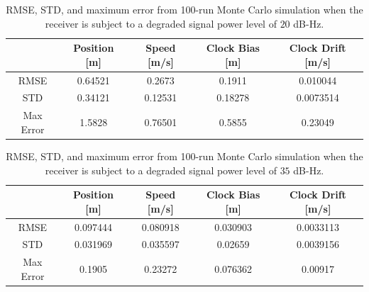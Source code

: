 \begin{table}[!ht]
    \caption{RMSE, STD, and maximum error from 100-run Monte Carlo simulation when the receiver is subject to a degraded signal power level of \(20\) dB-Hz.}\label{tbl:dyn20FVDM}
    \centering
    \begin{tabular}{ccccc}
        \toprule
                  & Position [m] & Speed [m/s] & Clock Bias [m] & Clock Drift [m/s] \\
        \midrule
        RMSE      & 0.64521      & 0.2673      & 0.1911         & 0.010044          \\
        STD       & 0.34121      & 0.12531     & 0.18278        & 0.0073514         \\
        Max Error & 1.5828       & 0.76501     & 0.5855         & 0.23049           \\
        \bottomrule
    \end{tabular}
\end{table}

\begin{table}[!ht]
    \caption{RMSE, STD, and maximum error from 100-run Monte Carlo simulation when the receiver is subject to a degraded signal power level of \(35\) dB-Hz.}\label{tbl:dyn35CV}
    \centering
    \begin{tabular}{ccccc}
        \toprule
                  & Position [m] & Speed [m/s] & Clock Bias [m] & Clock Drift [m/s] \\
        \midrule
        RMSE      & 0.097444     & 0.080918    & 0.030903       & 0.0033113         \\
        STD       & 0.031969     & 0.035597    & 0.02659        & 0.0039156         \\
        Max Error & 0.1905       & 0.23272     & 0.076362       & 0.00917           \\
        \bottomrule
    \end{tabular}
\end{table}

